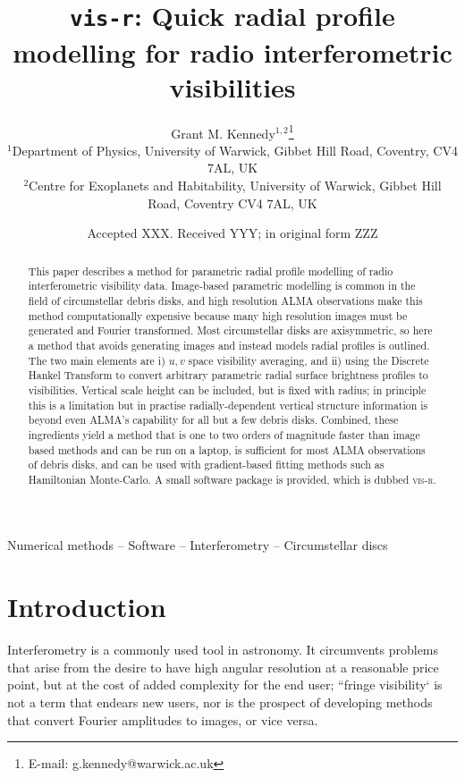 \documentclass[fleqn,usenatbib]{rasti}
\title[vis-r]{\texttt{vis-r}: Quick radial profile modelling for radio interferometric visibilities}
\author[G. M. Kennedy]{
Grant M. Kennedy$^{1,2}$\thanks{E-mail: g.kennedy@warwick.ac.uk}
\\
$^{1}$Department of Physics, University of Warwick, Gibbet Hill Road, Coventry, CV4 7AL, UK\\
$^{2}$Centre for Exoplanets and Habitability, University of Warwick, Gibbet Hill Road, Coventry CV4 7AL, UK\\
}
\date{Accepted XXX. Received YYY; in original form ZZZ}
\begin{document}
\label{firstpage}
\pagerange{\pageref{firstpage}--\pageref{lastpage}}
\maketitle

\begin{abstract}
This paper describes a method for parametric radial profile modelling of radio interferometric visibility data. Image-based parametric modelling is common in the field of circumstellar debris disks, and high resolution ALMA observations make this method computationally expensive because many high resolution images must be generated and Fourier transformed. Most circumstellar disks are axisymmetric, so here a method that avoids generating images and instead models radial profiles is outlined. The two main elements are i) $u,v$ space visibility averaging, and ii) using the Discrete Hankel Transform to convert arbitrary parametric radial surface brightness profiles to visibilities. Vertical scale height can be included, but is fixed with radius; in principle this is a limitation but in practise radially-dependent vertical structure information is beyond even ALMA's capability for all but a few debris disks. Combined, these ingredients yield a method that is one to two orders of magnitude faster than image based methods and can be run on a laptop, is sufficient for most ALMA observations of debris disks, and can be used with gradient-based fitting methods such as Hamiltonian Monte-Carlo. A small software package is provided, which is dubbed \textsc{vis-r}.
\end{abstract}

\begin{keywords}
Numerical methods -- Software -- Interferometry -- Circumstellar discs
\end{keywords}



\section{Introduction}

Interferometry is a commonly used tool in astronomy. It circumvents problems that arise from the desire to have high angular resolution at a reasonable price point, but at the cost of added complexity for the end user; ``fringe visibility` is not a term that endears new users, nor is the prospect of developing methods that convert Fourier amplitudes to images, or vice versa.
\end{document}
